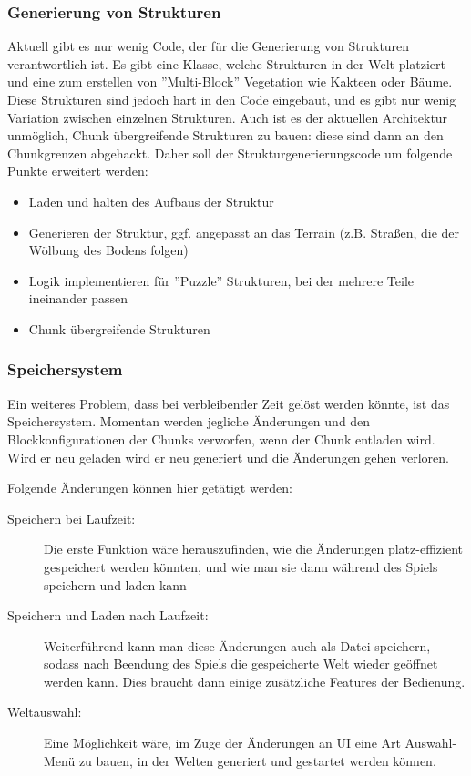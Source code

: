 \documentclass{article}
\begin{document}
\subsubsection{Generierung von Strukturen}

Aktuell gibt es nur wenig Code, der für die Generierung von Strukturen
verantwortlich ist. Es gibt eine Klasse, welche Strukturen in der Welt platziert
und eine zum erstellen von ''Multi-Block'' Vegetation wie Kakteen oder Bäume.
Diese Strukturen sind jedoch hart in den Code eingebaut, und es gibt nur wenig
Variation zwischen einzelnen Strukturen. Auch ist es der aktuellen Architektur
unmöglich, Chunk übergreifende Strukturen zu bauen: diese sind dann an den
Chunkgrenzen abgehackt. Daher soll der Strukturgenerierungscode um folgende
Punkte erweitert werden:

\begin{itemize}
	\item Laden und halten des Aufbaus der Struktur
	\item Generieren der Struktur, ggf. angepasst an das Terrain (z.B. Straßen,
	die der Wölbung des Bodens folgen)
	\item Logik implementieren für ''Puzzle'' Strukturen, bei der mehrere Teile
	ineinander passen
	\item Chunk übergreifende Strukturen
\end{itemize}

\subsubsection{Speichersystem}

Ein weiteres Problem, dass bei verbleibender Zeit gelöst werden könnte, ist das Speichersystem. Momentan werden jegliche Änderungen und den Blockkonfigurationen der Chunks verworfen, wenn der Chunk entladen wird. Wird er neu geladen wird er neu generiert und die Änderungen gehen verloren. 

Folgende Änderungen können hier getätigt werden:

\begin{description}
  \item[Speichern bei Laufzeit:] Die erste Funktion wäre herauszufinden, wie die Änderungen platz-effizient gespeichert werden könnten, und wie man sie dann während des Spiels speichern und laden kann
  \item[Speichern und Laden nach Laufzeit:] Weiterführend kann man diese Änderungen auch als Datei speichern, sodass nach Beendung des Spiels die gespeicherte Welt wieder geöffnet werden kann. Dies braucht dann einige zusätzliche Features der Bedienung.
  \item[Weltauswahl:] Eine Möglichkeit wäre, im Zuge der Änderungen an UI eine Art Auswahl-Menü zu bauen, in der Welten generiert und gestartet werden können.
\end{description}
\end{document}
